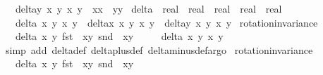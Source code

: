 \begin{isabellebody}
\ \ {\isachardoublequoteopen}delta{\isacharunderscore}y\ x{}\ y{}\ x{}\ y{}\ {\isacharequal}\ x{}{\isacharasterisk}x{}\ {\isacharplus}\ y{}{\isacharasterisk}y{}{\isachardoublequoteclose}\isanewline
{}\isamarkupfalse%
\ delta{\isacharprime}\ {\isacharcolon}{\isacharcolon}\ {\isachardoublequoteopen}real\ {\isasymRightarrow}\ real\ {\isasymRightarrow}\ real\ {\isasymRightarrow}\ real\ {\isasymRightarrow}\ real{\isachardoublequoteclose}\ \isanewline
\ \ {\isachardoublequoteopen}delta{\isacharprime}\ x{}\ y{}\ x{}\ y{}\ {\isacharequal}\ delta{\isacharunderscore}x\ x{}\ y{}\ x{}\ y{}\ {\isacharasterisk}\ delta{\isacharunderscore}y\ x{}\ y{}\ x{}\ y{}{\isachardoublequoteclose}\isanewline
\isanewline
{}\isamarkupfalse%
\ rotation{\isacharunderscore}invariance{\isacharunderscore}{}{\isacharcolon}\ \isanewline
\ \ {\isachardoublequoteopen}delta\ x{}\ y{}\ {\isacharparenleft}fst\ {\isacharparenleft}{\isasymrho}\ {\isacharparenleft}x{}{\isacharcomma}y{}{\isacharparenright}{\isacharparenright}{\isacharparenright}\ {\isacharparenleft}snd\ {\isacharparenleft}{\isasymrho}\ {\isacharparenleft}x{}{\isacharcomma}y{}{\isacharparenright}{\isacharparenright}{\isacharparenright}\ {\isacharequal}\ \isanewline
\ \ \ delta\ x{}\ y{}\ x{}\ y{}{\isachardoublequoteclose}\isanewline
%
\isadelimproof
\ \ %
\endisadelimproof
%
\isatagproof
{}\isamarkupfalse%
{\isacharparenleft}simp\ add{\isacharcolon}\ delta{\isacharunderscore}def\ delta{\isacharunderscore}plus{\isacharunderscore}def\ delta{\isacharunderscore}minus{\isacharunderscore}def{\isacharcomma}argo{\isacharparenright}%
\endisatagproof
{\isafoldproof}%
%
\isadelimproof
\isanewline
%
\endisadelimproof
\isanewline
{}\isamarkupfalse%
\ rotation{\isacharunderscore}invariance{\isacharunderscore}{}{\isacharcolon}\ \isanewline
\ \ {\isachardoublequoteopen}delta{\isacharprime}\ x{}\ y{}\ {\isacharparenleft}fst\ {\isacharparenleft}{\isasymrho}\ {\isacharparenleft}x{}{\isacharcomma}y{}{\isacharparenright}{\isacharparenright}{\isacharparenright}\ {\isacharparenleft}snd\ {\isacharparenleft}{\isasymrho}\ {\isacharparenleft}x{}{\isacharcomma}y{}{\isacharparenright}{\isacharparenright}{\isacharparenright}\ {\isacharequal}\ \isanewline

\end{isabellebody}
